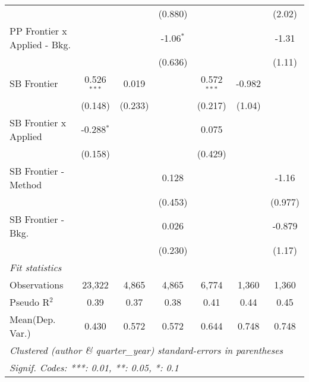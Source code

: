 \begin{tabular}{lcccccc}
                                  &                &               & (0.880)       &                &              & (2.02)\\   
   PP Frontier x Applied - Bkg.   &                &               & -1.06$^{*}$   &                &              & -1.31\\   
                                  &                &               & (0.636)       &                &              & (1.11)\\   
   SB Frontier                    & 0.526$^{***}$  & 0.019         &               & 0.572$^{***}$  & -0.982       &   \\   
                                  & (0.148)        & (0.233)       &               & (0.217)        & (1.04)       &   \\   
   SB Frontier x Applied          & -0.288$^{*}$   &               &               & 0.075          &              &   \\   
                                  & (0.158)        &               &               & (0.429)        &              &   \\   
   SB Frontier - Method           &                &               & 0.128         &                &              & -1.16\\   
                                  &                &               & (0.453)       &                &              & (0.977)\\   
   SB Frontier - Bkg.             &                &               & 0.026         &                &              & -0.879\\   
                                  &                &               & (0.230)       &                &              & (1.17)\\   
   \midrule
   \emph{Fit statistics}\\
   Observations                   & 23,322         & 4,865         & 4,865         & 6,774          & 1,360        & 1,360\\  
   Pseudo R$^2$                   & 0.39           & 0.37          & 0.38          & 0.41           & 0.44         & 0.45\\  
Mean(Dep. Var.) & 0.430 & 0.572 & 0.572 & 0.644 & 0.748 & 0.748 \\
   \midrule \midrule
   \multicolumn{7}{l}{\emph{Clustered (author \& quarter\_year) standard-errors in parentheses}}\\
   \multicolumn{7}{l}{\emph{Signif. Codes: ***: 0.01, **: 0.05, *: 0.1}}\\
\end{tabular}
\par\endgroup
